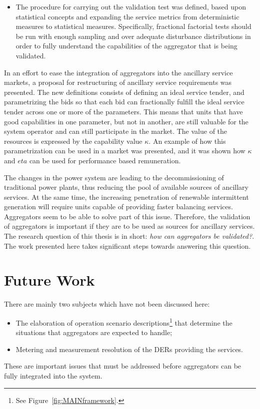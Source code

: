 \begin{description}
\begin{itemize}
			\item The procedure for carrying out the validation test was defined, based upon statistical concepts and expanding the service metrics from deterministic measures to statistical measures. Specifically, fractional factorial tests should be run with enough sampling and over adequate disturbance distributions in order to fully understand the capabilities of the aggregator that is being validated.
		\end{itemize}
\end{description}

In an effort to ease the integration of aggregators into the ancillary service markets, a proposal for restructuring of ancillary service requirements was presented. The new definitions consists of defining an ideal service tender, and parametrizing the bids so that each bid can fractionally fulfill the ideal service tender across one or more of the parameters. This means that units that have good capabilities in one parameter, but not in another, are still valuable for the system operator and can still participate in the market. The value of the resources is expressed by the capability value $\kappa$. An example of how this parametrization can be used in a market was presented, and it was shown how $\kappa$ and $eta$ can be used for performance based remuneration.

The changes in the power system are leading to the decommissioning of traditional power plants, thus reducing the pool of available sources of ancillary services. At the same time, the increasing penetration of renewable intermittent generation will require units capable of providing faster balancing services. Aggregators seem to be able to solve part of this issue. Therefore, the validation of aggregators is important if they are to be used as sources for ancillary services. The research question of this thesis is in short: \emph{how can aggregators be validated?}. The work presented here takes significant steps towards answering this question.

\section{Future Work} %
\label{sec:FutureWork}
There are mainly two subjects which have not been discussed here:
\begin{itemize}
	\item The elaboration of operation scenario descriptions\footnote{See Figure~\ref{fig:MAINframework}.} that determine the situations that aggregators are expected to handle;
	\item Metering and measurement resolution of the DERs providing the services. 
\end{itemize}
These are important issues that must be addressed before aggregators can be fully integrated into the system. 

